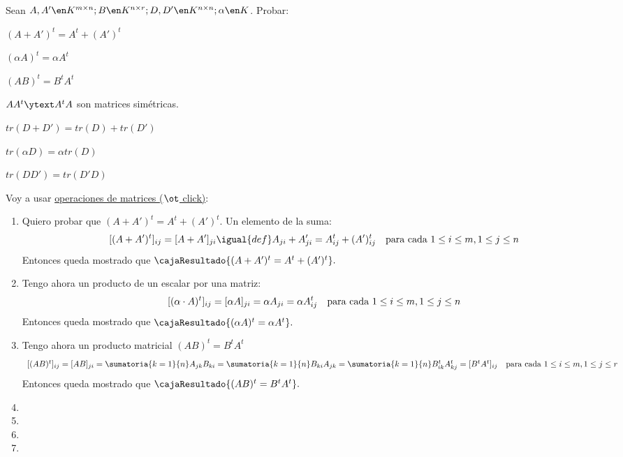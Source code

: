\begin{enunciado}{\ejercicio}
  Sean $A, A' \en K^{m \times n}; B \en K^{n \times r}; D, D' \en K^{n \times n}; \alpha \en K$. Probar:
  \begin{enumerate}[label=(\alph*)]
    \begin{multicols}{2}
      \item $(A + A')^t = A^t + (A')^t$
      \item $(\alpha A)^t = \alpha A^t$
      \item $(AB)^t = B^tA^t$
      \item $AA^t \ytext A^tA$ son matrices simétricas.
      \item $tr(D + D') = tr(D) + tr(D')$
      \item $tr(\alpha D) = \alpha tr(D)$
      \item $tr(D D') = tr(D'D)$
    \end{multicols}
  \end{enumerate}
\end{enunciado}

Voy a usar \hyperlink{teoria-1:operaciones-matrices}{operaciones de matrices {\tiny($\ot$ click)}}:
\begin{enumerate}[label=(\alph*)]
  \item  Quiero probar que $(A + A')^t = A^t + (A')^t$. Un elemento de la suma:
        $$
          [(A + A')^t]_{ij}
            =
            [A + A']_{ji} \igual{def} A_{ji} + A'_{ji}
          =
          A^t_{ij} + (A')^t_{ij}
          \text{\quad para cada } 1 \leq i \leq m, 1 \leq j \leq n
        $$
        Entonces queda mostrado que
        $
          \cajaResultado{
            (A + A')^t = A^t + (A')^t
          }.
        $

  \item Tengo ahora un producto de un escalar por una matriz:
        $$
          [(\alpha \cdot A)^t]_{ij}
            = [\alpha A]_{ji}
          = \alpha A_{ji}
          = \alpha A^t_{ij}
          \text{\quad para cada } 1 \leq i \leq m, 1 \leq j \leq n
        $$
        Entonces queda mostrado que
        $
          \cajaResultado{
            (\alpha A)^t = \alpha A^t
          }.
        $

  \item Tengo ahora un producto matricial $(AB)^t = B^tA^t$
        $$
          \begin{array}{c}
            [(AB)^t]_{ij}
              =
              [AB]_{ji} =
            \sumatoria{k = 1}{n} A_{jk} B_{ki} =
            \sumatoria{k = 1}{n} B_{ki} A_{jk} =
            \sumatoria{k = 1}{n} B^t_{ik} A^t_{kj} =
              [B^t A^t]_{ij}
            \text{\quad para cada } 1 \leq i \leq m, 1 \leq j \leq r
          \end{array}
        $$
        Entonces queda mostrado que
        $
          \cajaResultado{
            (AB)^t = B^t A^t
          }.
        $

  \item \hacer
  \item \hacer
  \item \hacer
  \item \hacer
\end{enumerate}

\begin{aportes}
  \item {}
\end{aportes}
